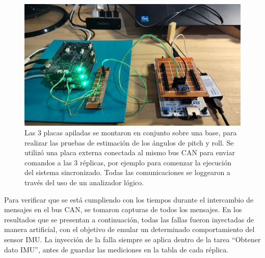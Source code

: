 \begin{figure}[H]
    \centering
    \includegraphics[width=\textwidth]{img/placas_stack_analizador_logico.jpg}
    \caption{Las 3 placas apiladas se montaron en conjunto sobre una base, para realizar las pruebas de estimación de los ángulos de pitch y roll. Se utilizó una placa externa conectada al mismo bus CAN para enviar comandos a las 3 réplicas, por ejemplo para comenzar la ejecución del sistema sincronizado. Todas las comunicaciones se loggearon a través del uso de un analizador lógico.}
    \label{fig:pruebas_stackeadas}
\end{figure}







Para verificar que se está cumpliendo con los tiempos durante el intercambio de mensajes en el bus CAN, se tomaron capturas de todos los mensajes. En los resultados que se presentan a continuación, todas las fallas fueron inyectadas de manera artificial, con el objetivo de emular un determinado comportamiento del sensor IMU. La inyección de la falla siempre se aplica dentro de la tarea ``Obtener dato IMU'', antes de guardar las mediciones en la tabla de cada réplica.

